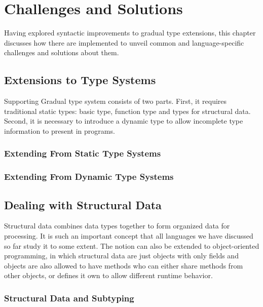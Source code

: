 
\renewcommand{\thechapter}{3}

\chapter{Challenges and Solutions}

Having explored syntactic improvements to gradual type extensions,
this chapter discusses how there are implemented to unveil common and language-specific
challenges and solutions about them.

\section{Extensions to Type Systems}

Supporting Gradual type system consists of two parts.
First, it requires traditional static types: basic type, function type and types for structural data.
Second, it is necessary to introduce a dynamic type to allow incomplete type information to present in programs.

\subsection{Extending From Static Type Systems}


\subsection{Extending From Dynamic Type Systems}


\section{Dealing with Structural Data}

Structural data combines data types together to form organized data for processing.
It is such an important concept that all languages we have discussed so far study
it to some extent. The notion can also be extended to object-oriented programming,
in which structural data are just objects with only fields and objects are also
allowed to have methods who can either share methods from other objects,
or defines it own to allow different runtime behavior.

\subsection{Structural Data and Subtyping}

